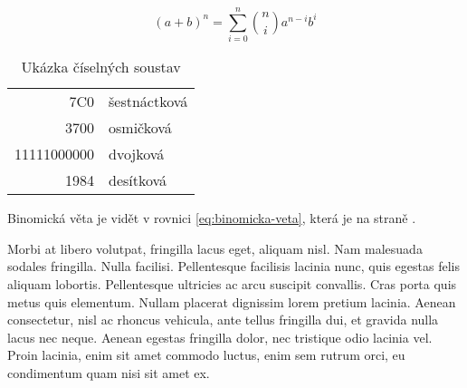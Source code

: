 \begin{equation} \label{eq:binomicka-veta}
(a+b)^n=\sum_{i=0}^{n}\binom{n}{i}a^{n-i}b^{i}
\end{equation}

\begin{table}
	\centering
	\caption{Ukázka číselných soustav}
	\begin{tabular}{|r|l|}
		\hline
		7C0 & šestnáctková \\
		3700 & osmičková \\
		11111000000 & dvojková \\
		\hline \hline
		1984 & desítková \\
		\hline
	\end{tabular}
\end{table}

Binomická věta je vidět v rovnici \ref{eq:binomicka-veta}, která je na straně \pageref{eq:binomicka-veta}.

Morbi at libero volutpat, fringilla lacus eget, aliquam nisl. Nam malesuada sodales fringilla. Nulla facilisi. Pellentesque facilisis lacinia nunc, quis egestas felis aliquam lobortis. Pellentesque ultricies ac arcu suscipit convallis. Cras porta quis metus quis elementum. Nullam placerat dignissim lorem pretium lacinia. Aenean consectetur, nisl ac rhoncus vehicula, ante tellus fringilla dui, et gravida nulla lacus nec neque. Aenean egestas fringilla dolor, nec tristique odio lacinia vel. Proin lacinia, enim sit amet commodo luctus, enim sem rutrum orci, eu condimentum quam nisi sit amet ex. 
